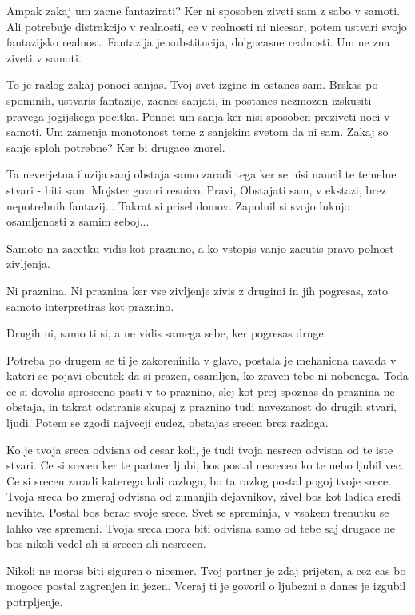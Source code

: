Ampak zakaj um zacne fantazirati? Ker ni sposoben ziveti sam z sabo v samoti. Ali potrebuje distrakcijo v realnosti, ce v realnosti ni nicesar, potem ustvari svojo fantazijsko realnost. Fantazija je substitucija, dolgocasne realnosti. Um ne zna ziveti v samoti. 

To je razlog zakaj ponoci sanjas. Tvoj svet izgine in ostanes sam. Brskas po spominih, ustvaris fantazije, zacnes sanjati, in postanes nezmozen izskusiti pravega jogijskega pocitka. Ponoci um sanja ker nisi sposoben preziveti noci v samoti. Um zamenja monotonost teme z sanjskim svetom da ni sam. Zakaj so sanje sploh potrebne? Ker bi drugace znorel. 

Ta neverjetna iluzija sanj obstaja samo zaradi tega ker se nisi naucil te temelne stvari - biti sam. Mojster govori resnico. Pravi,  Obstajati sam, v ekstazi, brez nepotrebnih fantazij... Takrat si prisel domov. Zapolnil si svojo luknjo osamljenosti z samim seboj... 

Samoto na zacetku vidis kot praznino, a ko vstopis vanjo zacutis pravo polnost zivljenja. 

Ni praznina. Ni praznina ker vse zivljenje zivis z drugimi in jih pogresas, zato samoto interpretiras kot praznino. 

Drugih ni, samo ti si, a ne vidis samega sebe, ker pogresas druge. 

Potreba po drugem se ti je zakoreninila v glavo, postala je mehanicna navada v kateri se pojavi obcutek da si prazen, osamljen, ko zraven tebe ni nobenega. Toda ce si dovolis sprosceno pasti v to praznino, slej kot prej spoznas da praznina ne obstaja, in takrat odstranis skupaj z praznino tudi navezanost do drugih stvari, ljudi. Potem se zgodi najvecji cudez, obstajas srecen brez razloga. 

Ko je tvoja sreca odvisna od cesar koli, je tudi tvoja nesreca odvisna od te iste stvari. Ce si srecen ker te partner ljubi, bos postal nesrecen ko te nebo ljubil vec. Ce si srecen zaradi katerega koli razloga, bo ta razlog postal pogoj tvoje srece. Tvoja sreca bo zmeraj odvisna od zunanjih dejavnikov, zivel bos kot ladica sredi nevihte. Postal bos berac svoje srece. Svet se spreminja, v vsakem trenutku se lahko vse spremeni. Tvoja sreca mora biti odvisna samo od tebe saj drugace ne bos nikoli vedel ali si srecen ali nesrecen. 

Nikoli ne moras biti siguren o nicemer. Tvoj partner je zdaj prijeten, a cez cas bo mogoce postal zagrenjen in jezen. Vceraj ti je govoril o ljubezni a danes je izgubil potrpljenje. 

